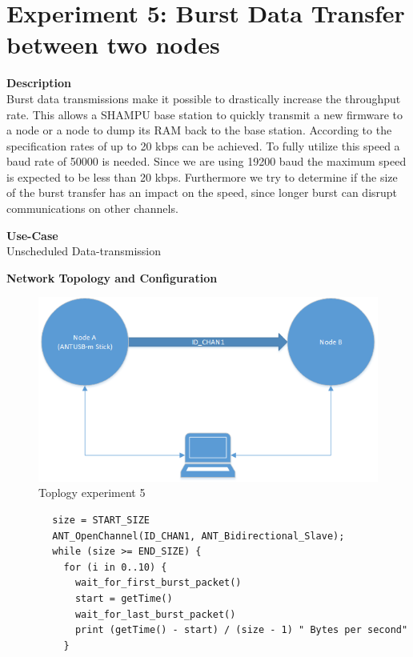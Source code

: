 \section{Experiment 5: Burst Data Transfer between two nodes}
\begin{description} 
	\item{\textbf{Description}} \hfill \\ Burst data transmissions make it possible to drastically increase the throughput rate. This allows a SHAMPU base station to quickly transmit a new firmware to a node or a node to dump its RAM back to the base station.	According to the  specification rates of up to 20 kbps can be achieved. To fully utilize this speed a baud rate of 50000 is needed. Since we are using 19200 baud the maximum speed is expected to be less than 20 kbps. Furthermore we try to determine if the size of the burst transfer has an impact on the speed, since longer burst can disrupt communications on other channels.
	\item{\textbf{Use-Case}} \hfill \\ Unscheduled Data-transmission
	\item{\textbf{Network Topology and Configuration}} \hfill \\ 
	\begin{figure}[H]
		\centering
		\includegraphics[scale=0.6]{./pics/exp5_topo.png}
		\caption{Toplogy experiment 5}
	\end{figure}
	\begin{code}[H]
		\begin{verbatim}
		size = START_SIZE
		ANT_OpenChannel(ID_CHAN1, ANT_Bidirectional_Slave);		
		while (size >= END_SIZE) {
		  for (i in 0..10) {
		    wait_for_first_burst_packet()
		    start = getTime()
		    wait_for_last_burst_packet()
		    print (getTime() - start) / (size - 1) " Bytes per second"
		  }

\end{verbatim}
\end{code}
\end{description}
